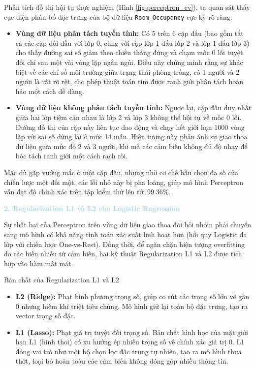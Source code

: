Phân tích đồ thị hội tụ thực nghiệm (Hình \ref{fig:perceptron_cv}), ta quan sát thấy cục diện phân bố đặc trưng của bộ dữ liệu \texttt{Room\_Occupancy} cực kỳ rõ ràng:
\begin{itemize}
    \item \textbf{Vùng dữ liệu phân tách tuyến tính:} Có 5 trên 6 cặp đấu (bao gồm tất cả các cặp đối đầu với lớp 0, cùng với cặp lớp 1 đấu lớp 2 và lớp 1 đấu lớp 3) cho thấy đường sai số giảm theo chiều thẳng đứng và chạm mốc 0 lỗi tuyệt đối chỉ sau một vài vòng lặp ngắn ngủi. Điều này chứng minh rằng sự khác biệt về các chỉ số môi trường giữa trạng thái phòng trống, có 1 người và 2 người là rất rõ rệt, cho phép thuật toán tìm được ranh giới phân tách hoàn hảo một cách dễ dàng.
    \item \textbf{Vùng dữ liệu không phân tách tuyến tính:} Ngược lại, cặp đấu duy nhất giữa hai lớp tiệm cận nhau là lớp 2 và lớp 3 không thể hội tụ về mốc 0 lỗi. Đường đồ thị của cặp này liên tục dao động và chạy hết giới hạn 1000 vòng lặp với sai số dừng lại ở mức 14 mẫu. Hiện tượng này phản ánh sự giao thoa dữ liệu giữa mức độ 2 và 3 người, khi mà các cảm biến không đủ độ nhạy để bóc tách ranh giới một cách rạch ròi.
\end{itemize}

Mặc dù gặp vướng mắc ở một cặp đấu, nhưng nhờ cơ chế bầu chọn đa số của chiến lược một đối một, các lỗi nhỏ này bị pha loãng, giúp mô hình Perceptron vẫn đạt độ chính xác trên tập kiểm thử lên tới 99.36\%.

\vspace{0.5em}
\noindent\textcolor{lightblue}{\textbf{2. Regularization L1 và L2 cho Logistic Regression}}
\vspace{0.5em}

Sự thất bại của Perceptron trên vùng dữ liệu giao thoa đòi hỏi nhóm phải chuyển sang mô hình có khả năng tính toán xác suất linh hoạt hơn (hồi quy Logistic đa lớp với chiến lược One-vs-Rest). Đồng thời, để ngăn chặn hiện tượng overfitting do các biến nhiễu từ cảm biến, hai kỹ thuật Regularization L1 và L2 được tích hợp vào hàm mất mát.

\begin{notebox}{Bản chất của Regularization L1 và L2}
\begin{itemize}
    \item \textbf{L2 (Ridge):} Phạt bình phương trọng số, giúp co rút các trọng số lớn về gần 0 nhưng hiếm khi triệt tiêu chúng. Mô hình giữ lại toàn bộ đặc trưng, tạo ra vector trọng số đặc.
    \item \textbf{L1 (Lasso):} Phạt giá trị tuyệt đối trọng số. Bản chất hình học của mặt giới hạn L1 (hình thoi) có xu hướng ép nhiều trọng số về chính xác giá trị $0$. L1 đóng vai trò như một bộ chọn lọc đặc trưng tự nhiên, tạo ra mô hình thưa thớt, loại bỏ hoàn toàn các cảm biến không đóng góp nhiều thông tin.
\end{itemize}
\end{notebox}

